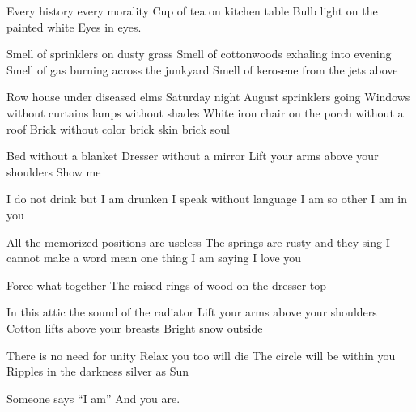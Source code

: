 \documentclass[english,11pt,letterpaper,onecolumn]{scrbook}
\begin{document}
\begin{poem}
\begin{stanza}
Every history every morality\verseline
Cup of tea on kitchen table\verseline
Bulb light on the painted white\verseline
Eyes in eyes.
\end{stanza}

\begin{stanza}
Smell of sprinklers on dusty grass\verseline
Smell of cottonwoods exhaling into evening\verseline
Smell of gas burning across the junkyard\verseline
Smell of kerosene from the jets above
\end{stanza}

\begin{stanza}
Row house under diseased elms\verseline
Saturday night August sprinklers going\verseline
Windows without curtains lamps without shades\verseline
White iron chair on the porch without a roof\verseline
Brick without color brick skin brick soul
\end{stanza}

\begin{stanza}
Bed without a blanket\verseline
Dresser without a mirror\verseline
Lift your arms above your shoulders\verseline
Show me
\end{stanza}

\begin{stanza}
I do not drink but I am drunken\verseline
I speak without language\verseline
I am so other\verseline
I am in you
\end{stanza}

\begin{stanza}
All the memorized positions are useless\verseline
The springs are rusty and they sing\verseline
I cannot make a word mean one thing\verseline
I am saying I love you
\end{stanza}

\begin{stanza}
Force what together\verseline
The raised rings of wood on the dresser top
\end{stanza}

\begin{stanza}
In this attic the sound of the radiator\verseline
Lift your arms above your shoulders\verseline
Cotton lifts above your breasts\verseline
Bright snow outside
\end{stanza}

\begin{stanza}
There is no need for unity\verseline
Relax you too will die\verseline
The circle will be within you\verseline
Ripples in the darkness silver as Sun
\end{stanza}

\begin{stanza}
Someone says ``I am''\verseline
And you are.%
\end{stanza}
\attribution{}
\end{poem}
\end{document}
